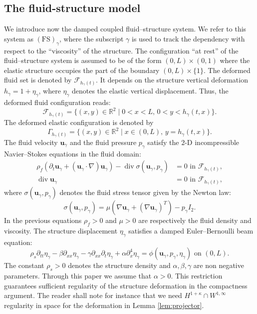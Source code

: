 \documentclass[10pt]{amsart}
\let\mathcal\mathscr
\newcommand{\FS}{\mathrm{FS}}
\theoremstyle{remark}
\theoremstyle{definition}
\newcommand{\Real}{\mathbb{R}}
\newcommand{\ug}{\boldsymbol{u}}
\DeclareMathOperator{\DIV}{div}
\begin{document}
\subsection{The fluid-structure model}
We introduce now the damped coupled fluid--structure system. We refer to
this system as $(\FS)_{\gamma}$, where the subscript $\gamma$ is used to track the dependency with respect to the ``viscosity'' of the structure. The configuration ``at rest'' of the fluid--structure system is assumed to be of the form $(0, L)\times (0, 1)$ where the elastic structure occupies the part of the boundary $(0, L)\times \{1\}$. The deformed fluid set is denoted by $\mathcal{F}_{h_{\gamma}(t)}$. It depends on the structure vertical deformation $h_{\gamma}=1+\eta_\gamma$, where $\eta_\gamma$ denotes the elastic vertical displacement.
Thus, the deformed fluid configuration reads:\vspace*{-3pt}\enlargethispage{.5\baselineskip}%
\begin{equation}\label{fluid.domain}
\mathcal{F}_{h_{\gamma}(t)}=\{(x,y)\in\mathbb{R}^{2}\mid 0<x<L,\,0<y<h_{\gamma}(t,x)\}.
\end{equation}
The deformed elastic configuration is denoted by
\[
\Gamma_{h_{\gamma}(t)}=\{(x,y)\in\Real^{2}\mid x\in(0,L),\,y=h_{\gamma}(t,x)\}.
\]
The fluid velocity $\ug_{\gamma}$ and the fluid pressure $p_{\gamma}$ satisfy the $2$-D incompressible Navier--Stokes equations in the fluid domain:
\begin{equation}\label{Navier-Stokes}
\begin{aligned}
\rho_{f}(\partial_{t}\ug_{\gamma} + (\ug_{\gamma}\cdot\nabla)\ug_{\gamma}) - \DIV{\sigma(\ug_{\gamma},p_{\gamma})} &{}= 0\text{ in }\mathcal{F}_{h_{\gamma}(t)},\\
\DIV{\ug_{\gamma}}&{}=0\text{ in }\mathcal{F}_{h_{\gamma}(t)},
\end{aligned}
\end{equation}
where $\sigma(\ug_{\gamma},p_{\gamma})$ denotes the fluid stress tensor given by the Newton law:
\[\sigma(\ug_{\gamma},p_{\gamma})=\mu(\nabla\ug_{\gamma} +( \nabla\ug_{\gamma})^{T}) -p_{\gamma}I_{2}.\]
In the previous equations $\rho_{f}>0$ and $\mu>0$ are respectively the fluid density and viscosity. The structure displacement $\eta_{\gamma}$ satisfies a damped Euler--Bernoulli beam equation:\vspace*{-3pt}
\begin{equation}\label{Beam.equation}
\rho_{s}\partial_{tt}\eta_{\gamma}-\beta\partial_{xx}\eta_{\gamma}-\gamma\partial_{xx}\partial_{t}\eta_{\gamma}+\alpha\partial_{x}^4\eta_{\gamma}=\phi(\ug_{\gamma},p_{\gamma},\eta_{\gamma})\text{ on }(0,L).
\end{equation}
The constant $\rho_{s}>0$ denotes the structure density and $\alpha,\beta,\gamma$ are non negative parameters.
Through this paper we assume that $\alpha>0$.
This restriction guarantees sufficient regularity of the structure deformation in the compactness argument. The reader shall note for instance that we need $H^{1+\kappa} \cap W^{1,\infty}$ regularity in space for the deformation in Lemma \ref{lem:projector}.
\end{document}
